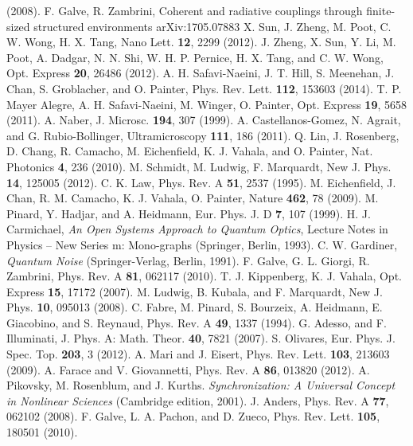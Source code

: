 \documentclass[a4paper]{jpconf}
\begin{document}
\begin{thebibliography}{99}
(2008).
 F. Galve, R. Zambrini, Coherent and radiative couplings through finite-sized structured environments
 arXiv:1705.07883
 X. Sun, J. Zheng, M. Poot, C. W. Wong, H. X. Tang, Nano Lett. 
\textbf{12}, 2299 (2012).
 J. Zheng, X. Sun, Y. Li, M. Poot, A. Dadgar, N. N. Shi, W. H. P. 
Pernice, H. X. Tang, and C. W. Wong, Opt. Express \textbf{20}, 26486 (2012).
 A. H. Safavi-Naeini, J. T. Hill, S. Meenehan, J. Chan, S. Groblacher, and O. Painter, Phys. Rev. Lett. \textbf{112}, 153603 (2014).
 T. P. Mayer Alegre, A. H. Safavi-Naeini, M. Winger, O. Painter, Opt. Express \textbf{19}, 5658 (2011).
 A. Naber, J. Microsc. \textbf{194}, 307 (1999).
 A. Castellanos-Gomez, N. Agrait, and G. Rubio-Bollinger, 
Ultramicroscopy \textbf{111}, 186 (2011).
 Q. Lin, J. Rosenberg, D. Chang, R. Camacho, M. Eichenfield, K. J. Vahala, and O. Painter, Nat. Photonics \textbf{4}, 236 (2010).
 M. Schmidt, M. Ludwig, F. Marquardt, New J. Phys. \textbf{14}, 125005 (2012).
 C. K. Law, Phys. Rev. A \textbf{51}, 2537 (1995).
 M. Eichenfield, J. Chan, R. M. Camacho, K. J. Vahala, O. Painter, 
Nature \textbf{462}, 78 (2009). 
 M. Pinard, Y. Hadjar, and A. Heidmann,  Eur. Phys. J. D 
\textbf{7}, 107 (1999).
 H. J. Carmichael, \textit{An Open Systems Approach to Quantum 
Optics}, Lecture Notes in Physics – New Series m: Mono-graphs (Springer, Berlin, 1993).
 C. W. Gardiner, \textit{Quantum Noise} (Springer-Verlag, Berlin, 1991).
 F. Galve, G. L. Giorgi, R. Zambrini, Phys. Rev. A \textbf{81}, 
062117 (2010).
 T. J. Kippenberg, K. J. Vahala, Opt. Express \textbf{15}, 17172 (2007).
 M. Ludwig, B. Kubala, and F. Marquardt, New J. Phys. \textbf{10}, 095013 (2008).
 C. Fabre, M. Pinard, S. Bourzeix, A. Heidmann, E. Giacobino, and S. Reynaud, Phys. Rev. A \textbf{49}, 1337 (1994).
 G. Adesso, and F. Illuminati, J. Phys. A: Math. Theor. \textbf{40}, 7821 (2007).
  S. Olivares, Eur. Phys. J. Spec. Top. \textbf{203}, 3 (2012).
 A. Mari and J. Eisert, Phys. Rev. Lett. {\bf 103}, 213603 (2009).
 A. Farace and V. Giovannetti, Phys. Rev. A {\bf 86}, 013820 (2012).
 A. Pikovsky, M. Rosenblum, and J. Kurths. \textit{Synchronization: 
A Universal Concept in Nonlinear Sciences} (Cambridge edition, 2001).
 J. Anders, Phys. Rev. A \textbf{77}, 062102 (2008).
 F. Galve, L. A. Pachon, and D. Zueco, Phys. Rev. Lett. \textbf{105}, 180501 (2010).

\end{thebibliography}
\end{document}
